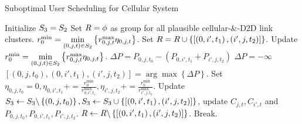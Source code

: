 \documentclass{ieeeaccess}
\begin{document}
\begin{algorithm}[h]
\caption{Suboptimal User Scheduling for Cellular System}
\label{alg:1}
\begin{algorithmic}[1]
\STATE Initialize ${{\bf{S}}_{\bf{3}}}={{\bf{S}}_{\bf{2}}}$
  \STATE Set ${\bf{R}} = \phi $ as group for all plausible cellular-\&-D2D link clusters.
  \STATE $r_0^{\min } = \mathop {\min }\limits_{\left( {0,j,t} \right) \in {{\bf{S}}_{\bf{2}}}} \left\{ {r_{0,j,t}^{\max }{\eta _{0,j,t}}} \right\}$.
            \STATE Set ${\bf{R = R}} \cup \left\{ {\left[ {\left( {0,i',{t_1}} \right),\left( {i',j,{t_2}} \right)} \right]} \right\}$.
          \ENDIF
        \ENDFOR
      \ENDIF
    \ENDFOR
  \ENDFOR
    \STATE Update $r_0^{\min } = \mathop {\min }\limits_{\left( {0,j,t} \right) \in {{\bf{S}}_{\bf{2}}}} \left\{ {r_{0,j,t}^{\max }{\eta _{0,j,t}}} \right\}$.
      \STATE $\Delta P = {P_{0,j,{t_0}}} - \left( {{P_{0,i',{t_1}}} + {P_{i',j,{t_2}}}} \right)$
    \ELSE{}
      \STATE $\Delta P =  - \infty $
    \ENDIF
      \STATE $\left[ {\left( {0,j,{t_0}} \right),\left( {0,i',{t_1}} \right),\left( {i',j,{t_2}} \right)} \right] = \arg \max \left\{ {\Delta P} \right\}$.
      \STATE Set ${\eta _{0,j,{t_0}}} = 0,{\eta _{0,i',{t_1}}} +  = \frac{{r_0^{\min }}}{{r_{0,i',{t_1}}^{\max }}},{\eta _{i',j,{t_2}}} +  = \frac{{r_0^{\min }}}{{r_{i',j,{t_2}}^{\max }}}$.
      \STATE Update ${{\bf{S}}_{\bf{3}}} \leftarrow {{\bf{S}}_{\bf{3}}}\backslash \left\{ {\left( {0,j,{t_0}} \right)} \right\},{{\bf{S}}_{\bf{3}}} \leftarrow {{\bf{S}}_{\bf{3}}} \cup \left\{ {\left[ {\left( {0,i',{t_1}} \right),\left( {i',j,{t_2}} \right)} \right]} \right\}$, update ${C_{j,t}},{C_{i',t}}$ and ${P_{0,j,{t_0}}},{P_{0,i',{t_1}}},{P_{i',j,{t_2}}}$.
      \STATE $\bf{R} \leftarrow \bf{R}\backslash \left\{ {\left[ {\left( {0,i',{t_1}} \right),\left( {i',j,{t_2}} \right)} \right]} \right\}$.
    \ELSE
      \STATE Break.
    \ENDIF
  \ENDWHILE
\ENDFOR
\end{algorithmic}
\end{algorithm}
\end{document}
